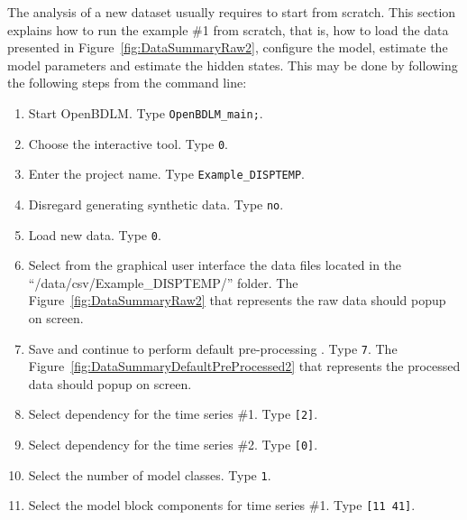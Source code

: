 The analysis of a new dataset usually requires to start from scratch.
This section explains how to run the example \#1 from scratch, that is, how to load the data presented in Figure~\ref{fig:DataSummaryRaw2}, configure the model, estimate the model parameters and estimate the hidden states.
This may be done by following the following steps from the \MATLAB{} command line:
\begin{enumerate}
\item Start OpenBDLM. Type \colorbox{light-gray}{\lstinline[basicstyle = \mlttfamily \small, backgroundcolor = \color{light-gray}]!OpenBDLM_main;!}.
\item Choose the interactive tool. Type \colorbox{light-gray}{\lstinline[basicstyle = \mlttfamily \small, backgroundcolor = \color{light-gray}]!0!}.
\item Enter the project name. Type \colorbox{light-gray}{\lstinline[basicstyle = \mlttfamily \small, backgroundcolor = \color{light-gray}]!Example_DISPTEMP!}. 
\item Disregard generating synthetic data. Type \colorbox{light-gray}{\lstinline[basicstyle = \mlttfamily \small, backgroundcolor = \color{light-gray}]!no!}. 
\item Load new data. Type \colorbox{light-gray}{\lstinline[basicstyle = \mlttfamily \small, backgroundcolor = \color{light-gray}]!0!}.
\item Select from the graphical user interface the data files located in the ``/data/csv/Example\_DISPTEMP/'' folder. The Figure~\ref{fig:DataSummaryRaw2} that represents the raw data should popup on screen.
\item Save and continue to perform default pre-processing . Type \colorbox{light-gray}{\lstinline[basicstyle = \mlttfamily \small, backgroundcolor = \color{light-gray}]!7!}. The Figure~\ref{fig:DataSummaryDefaultPreProcessed2} that represents the processed data should popup on screen.
\item Select dependency for the time series \#1. Type \colorbox{light-gray}{\lstinline[basicstyle = \mlttfamily \small, backgroundcolor = \color{light-gray}]![2]!}.
\item Select dependency for the time series \#2. Type \colorbox{light-gray}{\lstinline[basicstyle = \mlttfamily \small, backgroundcolor = \color{light-gray}]![0]!}.
\item Select the number of model classes. Type \colorbox{light-gray}{\lstinline[basicstyle = \mlttfamily \small, backgroundcolor = \color{light-gray}]!1!}. 
\item Select the model block components for time series \#1. Type \colorbox{light-gray}{\lstinline[basicstyle = \mlttfamily \small, backgroundcolor = \color{light-gray}]![11 41]!}.

\end{enumerate}
